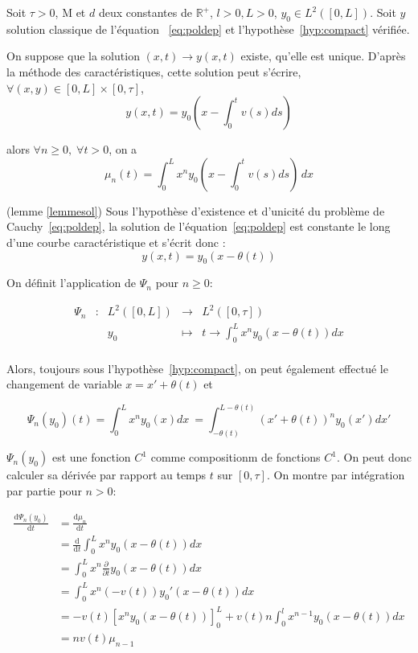 \documentclass[a4paper]{article}
\newcommand{\mass}{\mathrm{M}}
\newcommand{\dep}{d}
\begin{document}
\begin{lemme}
	\label{lemmesol}
	Soit $\tau>0$, $\mass$ et $\dep$ deux constantes de $\mathbb{R}^+$, 
	$l>0, L>0$, $y_0 \in L^2([0,L])$.
	Soit $y$ solution classique de l'équation ~\eqref{eq:poldep} et l'hypothèse~\eqref{hyp:compact} vérifiée.
	
	On suppose que la solution $(x,t) \to y(x,t)$ existe, qu'elle est unique. 
	D'après la méthode des caractéristiques, cette solution peut s'écrire,
	 $\forall (x,y) \in [0,L] \times [0, \tau]$, 
	\[y(x,t) = y_0(x-\int_{0}^t v(s)ds) \]
	
	alors $\forall n \geq 0, \; \forall t>0$, on a 
	\[\mu_n(t) = \int_0^L x^n y_0(x-\int_{0}^t v(s)ds) \, dx \]
\end{lemme}

\begin{preuve}
	(lemme \ref{lemmesol})
	Sous l'hypothèse d'existence et d'unicité du problème de Cauchy~\eqref{eq:poldep}, la solution de l'équation~\eqref{eq:poldep} est constante le long d'une courbe caractéristique et s'écrit donc :
\[ y(x,t) = y_0(x-\theta(t)) \]
\end{preuve}
  
  
 On définit l'application de $\Psi_n$ pour $n \geq 0$:

   \begin{equation}
  	\begin{array}{ccccc}
  	\Psi_n & : & L^2([0,L]) & \to & L^2([0,\tau]) \\
  	 & & y_0 & \mapsto & t \to \int_0^L x^n y_0(x-\theta(t)) dx\\
  	\end{array}
  \end{equation}
  
  
Alors, toujours sous l'hypothèse~\eqref{hyp:compact}, on peut également effectué le changement de variable $x =x'+\theta(t)$ et
  
\[ \Psi_n (y_0) (t) = \int_0^L x^n y_0(x) dx\ = \int_{-\theta(t)}^{L - \theta(t)} (x'+\theta(t))^ny_0(x')dx'\]
  
$\Psi_n (y_0)$ est une fonction $C^1$ comme compositionm de fonctions $C^1$.
On peut donc calculer sa dérivée par rapport au temps $t$ sur $[0,\tau]$.
On montre par intégration par partie pour $n>0$:
  
\[
\begin{split}
	\frac{\mathrm{d} \Psi_n (y_0) }{\mathrm{d}t} &= \frac{\mathrm{d} \mu_n }{\mathrm{d}t} \\
                                                 &= \frac{\mathrm{d}}{\mathrm{d}t}\int_0^L x^n y_0(x-\theta(t)) dx \\
	                                             &= \int_0^L x^n \frac{\partial}{\partial t}y_0(x-\theta(t)) dx \\
												 &= \int_0^L x^n (-v(t))y_0'(x-\theta(t)) dx \\
												 &= -v(t)[x^n y_0(x-\theta(t))]_0^L + v(t) n \int_0^l x^{n-1} y_0(x-\theta(t)) dx\\
												 &= n v(t) \mu_{n-1}
\end{split}
\]
\end{document}
